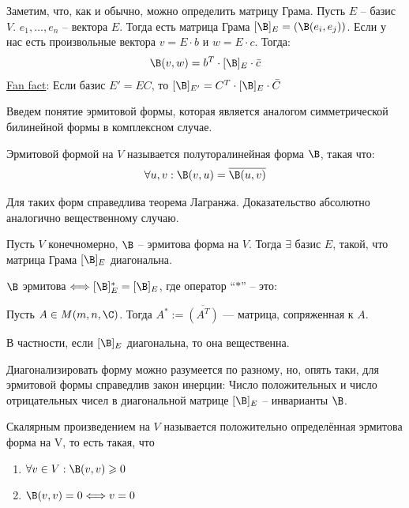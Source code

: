 Заметим, что, как и обычно, можно определить матрицу Грама. 
Пусть $E$ -- базис $V$. $e_1, \dots, e_n$ -- вектора $E$. Тогда есть матрица Грама $[\B]_E = (\B(e_i, e_j))$. 
Если у нас есть произвольные вектора $v = E \cdot b$ и $w = E \cdot c$. Тогда: 
\begin{gather*}
    \B(v, w) = b^T \cdot [\B]_E \cdot \bar{c}
\end{gather*}
\underline{Fan fact}:
Если базис $E' = EC$, то $[\B]_{E'} = C^T \cdot [\B]_{E} \cdot \bar{C}$

Введем понятие эрмитовой формы, которая является аналогом симметрической билинейной формы в комплексном случае. 
\begin{conj}
    Эрмитовой формой на $V$ называется полуторалинейная форма $\B$, такая что:  
    \begin{gather*}
        \forall u, v: \B(v, u) = \overline{\B(u, v)}
    \end{gather*}
\end{conj}
Для таких форм справедлива теорема Лагранжа. Доказательство абсолютно аналогично вещественному случаю. 
\begin{theorem}
    Пусть $V$ конечномерно, $\B$ --  эрмитова форма на $V$. Тогда $\exists$ базис $E$, такой, что матрица Грама $[\B]_E$ диагональна.
\end{theorem}

\notice $\B$ эрмитова $\Longleftrightarrow [\B]^*_E  = [\B]_E$, где оператор ``$*$'' -- это: 
\begin{conj}
    Пусть $A \in M(m, n, \C)$. Тогда $A^* := \overline{(A^T)}$ --- матрица, сопряженная к $A$.
\end{conj}
В частности, если $[\B]_E$ диагональна, то она вещественна.

Диагонализировать форму можно разумеется по разному, но, опять таки, для эрмитовой формы справедлив закон инерции:
Число положительных и число отрицательных чисел в диагональной матрице $[\B]_E$ -- инварианты $\B$.

\begin{conj}
    Скалярным произведением на $V$ называется положительно определённая эрмитова форма на V, то есть такая, что
    \begin{enumerate}
        \item $\forall v \in V: \B(v, v) \geqslant 0$
        \item $\B(v, v) = 0 \Longleftrightarrow v = 0$
    \end{enumerate}
\end{conj}

